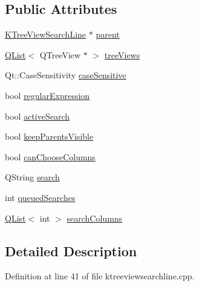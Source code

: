 \subsection*{Public Attributes}
\begin{DoxyCompactItemize}
\item 
\hyperlink{classKTreeViewSearchLine}{K\+Tree\+View\+Search\+Line} $\ast$ \hyperlink{classKTreeViewSearchLine_1_1Private_a423d46500ac68a1bd6b552ef18d1ef5a}{parent}
\item 
\hyperlink{classQList}{Q\+List}$<$ Q\+Tree\+View $\ast$ $>$ \hyperlink{classKTreeViewSearchLine_1_1Private_a1cc9fa46d2d3b371f075b8beea071555}{tree\+Views}
\item 
Qt\+::\+Case\+Sensitivity \hyperlink{classKTreeViewSearchLine_1_1Private_ac529094933f7a304381f4f51831138d7}{case\+Sensitive}
\item 
bool \hyperlink{classKTreeViewSearchLine_1_1Private_ab02ea0ecfae43ab59884906e98e1468e}{regular\+Expression}
\item 
bool \hyperlink{classKTreeViewSearchLine_1_1Private_ad57ae3ad4ebe425fbc7cb83021246e01}{active\+Search}
\item 
bool \hyperlink{classKTreeViewSearchLine_1_1Private_adc388c2942a71f2ef94b21ef6edd1f2f}{keep\+Parents\+Visible}
\item 
bool \hyperlink{classKTreeViewSearchLine_1_1Private_a4b7cae206d347905d89dff317c22a87c}{can\+Choose\+Columns}
\item 
Q\+String \hyperlink{classKTreeViewSearchLine_1_1Private_aff7b4392b7cf091307c4e62c69556929}{search}
\item 
int \hyperlink{classKTreeViewSearchLine_1_1Private_a58af968b763733896e97cd2097fd1b6e}{queued\+Searches}
\item 
\hyperlink{classQList}{Q\+List}$<$ int $>$ \hyperlink{classKTreeViewSearchLine_1_1Private_a2e8b3ddf8c1f4a5812f863eda57188d6}{search\+Columns}
\end{DoxyCompactItemize}


\subsection{Detailed Description}


Definition at line 41 of file ktreeviewsearchline.\+cpp.



